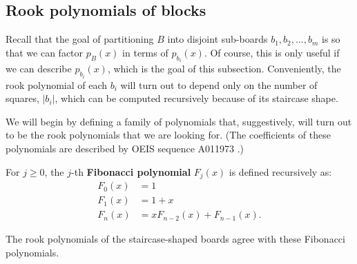

\subsection{Rook polynomials of blocks}
Recall that the goal of partitioning $B$ into disjoint sub-boards
$b_1, b_2, \dots, b_m$ is so that we can
factor $p_B(x)$ in terms of $p_{b_i}(x)$.
Of course, this is only useful if we can describe $p_{b_i}(x)$,
which is the goal of this subsection.
Conveniently, the rook polynomial of each $b_i$ will turn out to depend only on the
number of squares, $|b_i|$, which can be computed recursively because of its
staircase shape.

We will begin by defining a family of polynomials that, suggestively, will turn
out to be the rook polynomials that we are looking for.
(The coefficients of these polynomials are described by OEIS sequence A011973 \cite{oeis}.)
\begin{definition}
  For $j \geq 0$, the $j$-th \textbf{Fibonacci polynomial} $F_{j}(x)$ is defined recursively as:
  \begin{align}
    F_0(x) &= 1 \\
    F_1(x) &= 1 + x \\
    F_n(x) &= xF_{n-2}(x) + F_{n-1}(x).
  \end{align}
\label{def:FibonacciPolynomial}
\end{definition}

The rook polynomials of the staircase-shaped boards agree with these Fibonacci
polynomials.

